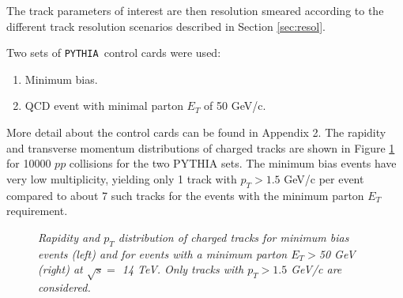 \documentclass{cmspaper}
\def\pythia {\texttt{PYTHIA }}
\begin{document}
The track parameters of interest are then resolution smeared according to the different track resolution scenarios 
described in Section \ref{sec:resol}. 

Two sets of \pythia control cards were used:
\begin{enumerate}
\item Minimum bias.
\item QCD event with minimal  parton $E_T$ of 50 GeV/c.
\end{enumerate} 
More detail about the control cards can be found in Appendix 2.
The rapidity and transverse momentum  distributions of 
charged tracks are shown in Figure \ref{fig:pythia} for 10000 $pp$ collisions for the two PYTHIA sets. The minimum bias events have very low 
multiplicity, yielding only 1 track with  $p_T > 1.5 $ GeV/c per event 
compared to about 7 such tracks for the events with the minimum parton $E_T$ requirement. 


\begin{figure}[hbtp]
  \begin{center}
    \caption{\it Rapidity and $p_T$ distribution of charged tracks for minimum bias events (left) and for events with a minimum parton $E_T>$50 GeV (right) 
                at $\sqrt{s}=$ 14 TeV. Only tracks with  $p_T> 1.5$ GeV/c are considered.}
    \label{fig:pythia}
  \end{center}
\end{figure}


\end{document}
